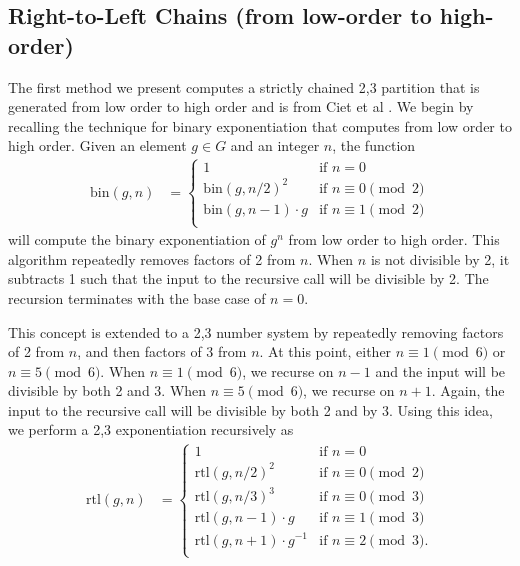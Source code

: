 \documentclass{ucalgthes1}
\theoremstyle{definition}
\begin{document}
\subsection{Right-to-Left Chains (from low-order to high-order)}
\label{subsec:rtolChains}

The first method we present computes a strictly chained 2,3 partition that is generated from low order to high order and is from Ciet et al \cite{Ciet2006}.  We begin by recalling the technique for binary exponentiation that computes from low order to high order.  Given an element $g \in G$ and an integer $n$, the function
\begin{align*}
\textrm{bin}(g, n) &= \begin{cases}
               1 & \textrm{if $n = 0$} \\
               {\textrm{bin}(g, n/2)}^2 & \textrm{if $n \equiv 0 \pmod 2$} \\
               \textrm{bin}(g, n-1) \cdot g & \textrm{if $n \equiv 1 \pmod 2$} \\
	       \end{cases}
\end{align*}
will compute the binary exponentiation of $g^n$ from low order to high order. This algorithm repeatedly removes factors of 2 from $n$.  When $n$ is not divisible by 2, it subtracts 1 such that the input to the recursive call will be divisible by 2.  The recursion terminates with the base case of $n=0$.

This concept is extended to a 2,3 number system by repeatedly removing factors of 2 from $n$, and then factors of 3 from $n$.  At this point, either $n \equiv 1 \pmod 6$ or $n \equiv 5 \pmod 6$.  When $n \equiv 1 \pmod 6$, we recurse on $n-1$ and the input will be divisible by both 2 and 3.  When $n \equiv 5 \pmod 6$, we recurse on $n+1$.  Again, the input to the recursive call will be divisible by both 2 and by 3.  Using this idea, we perform a 2,3 exponentiation recursively as
\newcommand{\rtol}{\textrm{rtl}}
\begin{align*}
\rtol(g, n) &= \begin{cases}
               1 & \textrm{if $n = 0$} \\
               {\rtol(g, n/2)}^2 & \textrm{if $n \equiv 0 \pmod 2$} \\
               {\rtol(g, n/3)}^3 & \textrm{if $n \equiv 0 \pmod 3$} \\
               \rtol(g, n-1) \cdot g & \textrm{if $n \equiv 1 \pmod 3$} \\
               \rtol(g, n+1) \cdot g^{-1} & \textrm{if $n \equiv 2 \pmod 3$}. \\
	       \end{cases}
\end{align*}
\end{document}
